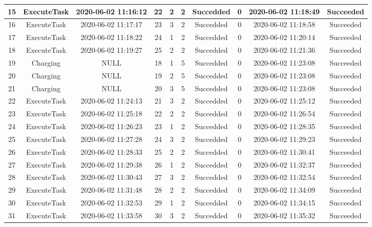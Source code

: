 \begin{table}[]
{\begin{tabular}{|c|c|c|c|c|c|c|c|c|c|}
15 & ExecuteTask & 2020-06-02 11:16:12 & 22 & 2 & 2 & Succedded & 0    & 2020-06-02 11:18:49 & Succeeded \\ \hline
16 & ExecuteTask & 2020-06-02 11:17:17 & 23 & 3 & 2 & Succedded & 0    & 2020-06-02 11:18:58 & Succeeded \\ \hline
17 & ExecuteTask & 2020-06-02 11:18:22 & 24 & 1 & 2 & Succedded & 0    & 2020-06-02 11:20:14 & Succeeded \\ \hline
18 & ExecuteTask & 2020-06-02 11:19:27 & 25 & 2 & 2 & Succedded & 0    & 2020-06-02 11:21:36 & Succeeded \\ \hline
19 & Charging    & NULL                & 18 & 1 & 5 & Succedded & 0 & 2020-06-02 11:23:08 & Succeeded \\ \hline
20 & Charging    & NULL                & 19 & 2 & 5 & Succedded & 0 & 2020-06-02 11:23:08 & Succeeded \\ \hline
21 & Charging    & NULL                & 20 & 3 & 5 & Succedded & 0 & 2020-06-02 11:23:08 & Succeeded \\ \hline
22 & ExecuteTask & 2020-06-02 11:24:13 & 21 & 3 & 2 & Succedded & 0 & 2020-06-02 11:25:12 & Succeeded \\ \hline
23 & ExecuteTask & 2020-06-02 11:25:18 & 22 & 2 & 2 & Succedded & 0 & 2020-06-02 11:26:54 & Succeeded \\ \hline
24 & ExecuteTask & 2020-06-02 11:26:23 & 23 & 1 & 2 & Succedded & 0 & 2020-06-02 11:28:35 & Succeeded \\ \hline
25 & ExecuteTask & 2020-06-02 11:27:28 & 24 & 3 & 2 & Succedded & 0 & 2020-06-02 11:29:23 & Succeeded \\ \hline
26 & ExecuteTask & 2020-06-02 11:28:33 & 25 & 2 & 2 & Succedded & 0    & 2020-06-02 11:30:41 & Succeeded \\ \hline
27 & ExecuteTask & 2020-06-02 11:29:38 & 26 & 1 & 2 & Succedded & 0    & 2020-06-02 11:32:37 & Succeeded \\ \hline
28 & ExecuteTask & 2020-06-02 11:30:43 & 27 & 3 & 2 & Succedded & 0    & 2020-06-02 11:32:54 & Succeeded \\ \hline
29 & ExecuteTask & 2020-06-02 11:31:48 & 28 & 2 & 2 & Succedded & 0    & 2020-06-02 11:34:09 & Succeeded \\ \hline
30 & ExecuteTask & 2020-06-02 11:32:53 & 29 & 1 & 2 & Succedded & 0    & 2020-06-02 11:34:15 & Succeeded \\ \hline
31 & ExecuteTask & 2020-06-02 11:33:58 & 30 & 3 & 2 & Succedded & 0    & 2020-06-02 11:35:32 & Succeeded \\ \hline

\end{tabular}}
\end{table}
